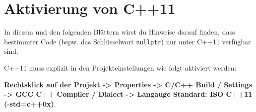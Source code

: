 \section*{Aktivierung von C++11}

In diesem und den folgenden Blättern wirst du Hinweise darauf finden, dass bestimmter Code (bspw. das Schlüsselwort \texttt{nullptr}) nur unter C++11 verfügbar sind.

C++11 muss explizit in den Projekteinstellungen wie folgt aktiviert werden:

\textbf{Rechtsklick auf der Projekt -> Properties -> C/C++ Build / Settings -> GCC C++ Compiler / Dialect -> Langauge Standard: ISO C++11 (-std=c++0x)}.